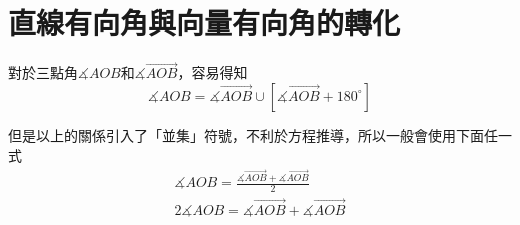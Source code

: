 \documentclass[12pt]{article}
\begin{document}
\section{直線有向角與向量有向角的轉化}
對於三點角$\measuredangle{AOB}$和$\measuredangle{\overrightarrow{AOB}}$，容易得知
$$
    \measuredangle{AOB}=\measuredangle{\overrightarrow{AOB}}\cup\left[\measuredangle{\overrightarrow{AOB}}+180^{\circ}\right]
$$

但是以上的關係引入了「並集」符號，不利於方程推導，所以一般會使用下面任一式
\begin{align}
    \measuredangle{AOB}=\frac{\measuredangle{\overrightarrow{AOB}}+\measuredangle{\overrightarrow{AOB}}}{2}\\
    2\measuredangle{AOB}=\measuredangle{\overrightarrow{AOB}}+\measuredangle{\overrightarrow{AOB}}
\end{align}
\end{document}
